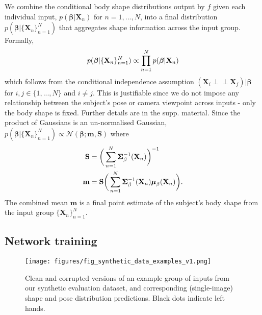 \documentclass[final]{cvpr}
\newcommand{\indep}{\perp \!\!\! \perp}
\begin{document}
We combine the conditional body shape distributions output by $f$ given each individual input, $p(\boldsymbol{\beta} | \mathbf{X}_n)$ for $n = 1, ..., N$, into a final distribution $p(\boldsymbol{\beta} | \{\mathbf{X}_n\}_{n=1}^N)$ that aggregates shape information across the input group. Formally,
\begin{equation}
p(\boldsymbol{\beta} | \{\mathbf{X}_n\}_{n=1}^N) 
\propto \prod_{n=1}^N p(\boldsymbol{\beta} | \mathbf{X}_n)
\label{eqn:probabilistic_shape_combination}
\vspace{-0.1cm}
\end{equation}
which follows from the conditional independence assumption $(\mathbf{X}_i \indep \mathbf{X}_j) | \boldsymbol{\beta}$ for $i,j \in \{1,...,N\}$ and $i \neq j$. This is justifiable since we do not impose any relationship between the subject's pose or camera viewpoint across inputs - only the body shape is fixed. Further details are in the supp. material. Since the product of Gaussians is an un-normalised Gaussian, $p(\boldsymbol{\beta} | \{\mathbf{X}_n\}_{n=1}^N) \propto \mathcal{N}(\boldsymbol{\beta}; \mathbf{m}, \mathbf{S})$ where
\begin{equation}
\begin{aligned}
\mathbf{S} &= \bigg(\sum_{n=1}^N \boldsymbol{\Sigma}^{-1}_\beta ({\mathbf{X}_n})\bigg)^{-1}\\
\mathbf{m} &= \mathbf{S}\bigg(\sum_{n=1}^N \boldsymbol{\Sigma}^{-1}_\beta({\mathbf{X}_n})\boldsymbol{\mu}_\beta({\mathbf{X}_n})\bigg).
\end{aligned}
\label{eqn:combined_shape_mean_var}
\vspace{-0.2cm}
\end{equation}
The combined mean $\mathbf{m}$ is a final point estimate of the subject's body shape from the input group $\{\mathbf{X}_n\}_{n=1}^N$.

\vspace{-0.05cm}
\subsection{Network training}
\label{subsec:network_training}

\begin{figure}[t]
    \centering
    \texttt{[image: figures/fig\_synthetic\_data\_examples\_v1.png]}
    \caption{Clean and corrupted versions of an example group of inputs from our synthetic evaluation dataset, and corresponding (single-image) shape and pose distribution predictions. Black dots indicate left hands.}
    \label{fig:synthtic_data_example_predictions}
    \vspace{-0.3cm}
\end{figure}
\end{document}
